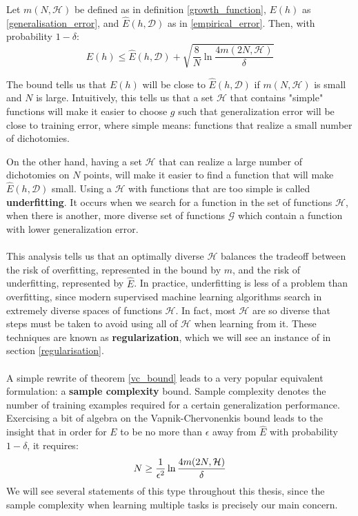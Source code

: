 \begin{theorem}
	\label{vc_bound}
	Let $m(N, \mathcal{H})$ be defined as in definition \ref{growth_function}, $E(h)$ as \ref{generalisation_error}, and $\hat{E}(h, \mathcal{D})$ as in \ref{empirical_error}. Then, with probability $1 - \delta$:
	$$
	E(h) \leq \hat{E}(h, \mathcal{D}) + \sqrt{\frac{8}{N}\ln \frac{4m(2N, \mathcal{H})}{\delta}}
	$$
\end{theorem}
The bound tells us that $E(h)$ will be close to $\hat{E}(h, \mathcal{D})$ if $m(N, \mathcal{H})$ is small and $N$ is large. Intuitively, this tells us that a set $\mathcal{H}$ that contains "simple" functions will make it easier to choose $g$ such that generalization error will be close to training error, where simple means: functions that realize a small number of dichotomies.

On the other hand, having a set $\mathcal{H}$ that can realize a large number of dichotomies on $N$ points, will make it easier to find a function that will make $\hat{E}(h, \mathcal{D})$ small. Using a $\mathcal{H}$ with functions that are too simple is called \textbf{underfitting}. It occurs when we search for a function in the set of functions $\mathcal{H}$, when there is another, more diverse set of functions $\mathcal{G}$ which contain a function with lower generalization error.
\\\\
This analysis tells us that an optimally diverse $\mathcal{H}$ balances the tradeoff between the risk of overfitting, represented in the bound by $m$, and the risk of underfitting, represented by $\hat{E}$. In practice, underfitting is less of a problem than overfitting, since modern supervised machine learning algorithms search in extremely diverse spaces of functions $\mathcal{H}$. In fact, most $\mathcal{H}$ are so diverse that steps must be taken to avoid using all of $\mathcal{H}$ when learning from it. These techniques are known as \textbf{regularization}, which we will see an instance of in section \ref{regularisation}.
\\\\
A simple rewrite of theorem \ref{vc_bound} leads to a very popular equivalent formulation: a \textbf{sample complexity} bound. Sample complexity denotes the number of training examples required for a certain generalization performance. Exercising a bit of algebra on the Vapnik-Chervonenkis bound leads to the insight that in order for $E$ to be no more than $\epsilon$ away from $\hat{E}$ with probability $1 - \delta$, it requires:
$$
N \geq \frac{1}{\epsilon^2}\ln \frac{4m(2N, \mathcal{H})}{\delta}
$$
We will see several statements of this type throughout this thesis, since the sample complexity when learning multiple tasks is precisely our main concern.
